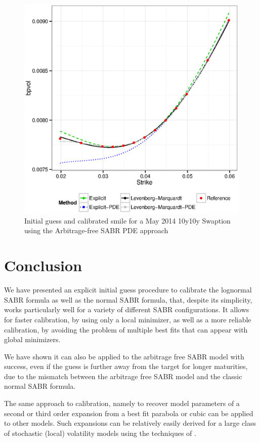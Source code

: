 \documentclass[]{rAMF2e}
\begin{document}
\begin{figure}[htbp]
  \caption{\label{fig:normal_vs_arbfree_fit_10y10y}Initial guess and calibrated smile for a May 2014 10y10y Swaption using the Arbitrage-free SABR PDE approach }
\begin{center}
 \includegraphics[width=12cm]{normal_vs_arbfree_fit_10y10y.eps}
\end{center}
\end{figure}

\section{Conclusion}
We have presented an explicit initial guess procedure to calibrate the lognormal SABR formula as well as the normal SABR formula, that, despite its simplicity, works particularly well for a variety of different SABR configurations. It allows for faster calibration, by using only a local minimizer, as well as a more reliable calibration, by avoiding the problem of multiple best fits that can appear with global minimizers. 

We have shown it can also be applied to the arbitrage free SABR model with success, even if the guess is further away from the target for longer maturities, due to the mismatch between the arbitrage free SABR model and the classic normal SABR formula.

The same approach to calibration, namely to recover model parameters of a second or third order expansion from a best fit parabola or cubic can be applied to other models. Such expansions can be relatively easily derived for a large class of stochastic (local) volatility models using the techniques of \citep{lorig2014implied}.
\newpage
\appendix
\end{document}
